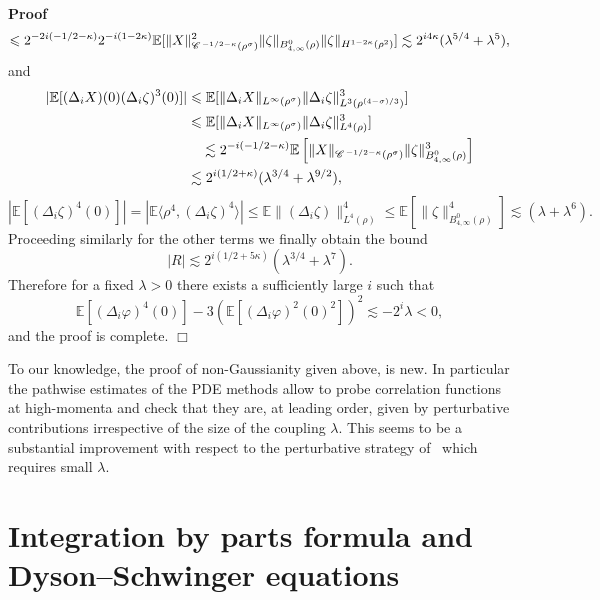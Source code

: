 \documentclass[a4paper,11pt]{article}
\newenvironment{proof}{\noindent\textbf{Proof\ }}{\hspace*{\fill}$\Box$\medskip}
\numberwithin{equation}{section}
\newcommand{\CC}{\mathscr{C} \hspace{.1em}}
\begin{document}
\begin{proof}
  \[ \leqslant 2^{- 2 i (- 1 / 2 - \kappa)} 2^{- i (1 - 2 \kappa)} \mathbb{E}
     [\| X \|^2_{\CC^{-1/2-\kappa} (\rho^{\sigma})} \| \zeta \|_{B^0_{4, \infty}
     (\rho)} \|  \zeta \|_{H^{1 - 2 \kappa} (\rho^2)}] \lesssim 2^{i 4
     \kappa} ({\lambda^{5/4}+\lambda^{5}}), \]
  and
  \[ 
  \begin{aligned}
  | \mathbb{E} [(\Delta_i X) (0) (\Delta_i \zeta)^3 (0)] | & \leqslant
     \mathbb{E} [\| \Delta_i X \|_{L^{\infty} (\rho^{\sigma})} \| \Delta_i
     \zeta \|^3_{L^3 (\rho^{(4 - \sigma) / 3})}] \\
  & \leqslant \mathbb{E} [\| \Delta_i X \|_{L^{\infty} (\rho^{\sigma})} \|
     \Delta_i \zeta \|^3_{L^4 (\rho)}] \\ & \quad \lesssim 2^{- i (- 1 / 2 - \kappa)}
     \mathbb{E} \left[ \| X \|_{\CC^{- 1 / 2 - \kappa} (\rho^{\sigma})} \|
     \zeta \|^3_{B^0_{4, \infty} (\rho)} \right] \\
   & \lesssim 2^{i (1 / 2 +
     \kappa)}({\lambda^{3/4}+\lambda^{9/2}}),
     \end{aligned} \]
  \[ | \mathbb{E} [(\Delta_i \zeta)^4 (0)] | = | \mathbb{E} \langle \rho^4,
     (\Delta_i \zeta)^4 \rangle | \leqslant \mathbb{E} \| (\Delta_i \zeta)
     \|^4_{L^4 (\rho)} \leqslant \mathbb{E} [\| \zeta \|^4_{B^0_{4, \infty}
     (\rho)}] \lesssim ({\lambda+\lambda^{6}}). \]
  Proceeding similarly for the other terms we finally obtain the  bound   \[ | R | \lesssim  2^{i (1 / 2 + 5 \kappa)} ({\lambda^{3/4}+\lambda^{7}}). \]
  Therefore for a fixed $\lambda>0$ there exists  a sufficiently large $i$  such that
  \[ \mathbb{E} [(\Delta_i \varphi)^4 (0)] - 3 (\mathbb{E} [(\Delta_i
     \varphi)^2 (0)^2])^2 \lesssim -2^i \lambda < 0, \]
  and the proof is complete.
\end{proof}

\begin{remark}\label{rem:rev1}
To our knowledge, the proof of non-Gaussianity given above, is new. In particular the pathwise estimates of the PDE methods allow to probe correlation functions at high-momenta and check that they are, at leading order, given by perturbative contributions irrespective of the size of the coupling $\lambda$. This seems to be a substantial improvement with respect to the perturbative strategy of~\cite{MR723546} which requires small $\lambda$.
\end{remark}

\section{Integration by parts formula and Dyson--Schwinger equations}
\label{s:sd}
\end{document}

